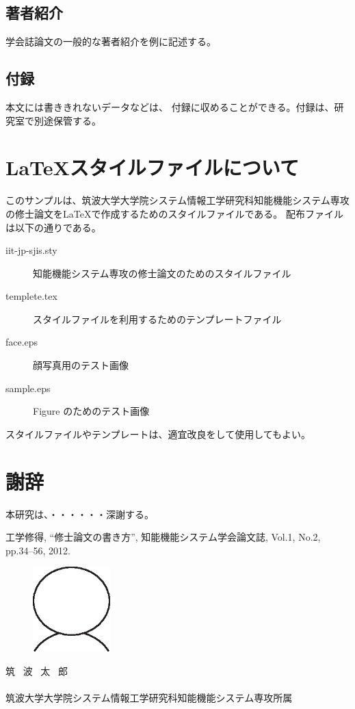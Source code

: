 ﻿\documentclass[11pt,twocolumn]{jarticle} %
\begin{document}
\subsection{著者紹介}
学会誌論文の一般的な著者紹介を例に記述する。

\subsection{付録}
本文には書ききれないデータなどは、
付録に収めることができる。付録は、研究室で別途保管する。



\section{\LaTeX スタイルファイルについて}
このサンプルは、筑波大学大学院システム情報工学研究科知能機能システム専攻の修士論文を\LaTeX で作成するためのスタイルファイルである。
配布ファイルは以下の通りである。
\begin{description}
 \item[iit-jp-sjis.sty]  知能機能システム専攻の修士論文のためのスタイルファイル
 \item[templete.tex] スタイルファイルを利用するためのテンプレートファイル
 \item[face.eps] 顔写真用のテスト画像
 \item[sample.eps] Figure のためのテスト画像
\end{description}

スタイルファイルやテンプレートは、適宜改良をして使用してもよい。

\section*{謝辞}
本研究は、・・・・・・深謝する。



\begin{thebibliography}{9}
  工学修得, ``修士論文の書き方'', 知能機能システム学会論文誌, Vol.1, No.2, pp.34--56, 2012.
\end{thebibliography}


\vspace{2zh}
\begin{minipage}{73mm}
 \begin{figure} 
 \begin{center}
  \includegraphics[width=30mm]{face.eps}
 \end{center}
 \end{figure}
 \noindent 筑 \ 波 \ 太 \  郎\\\\
 筑波大学大学院システム情報工学研究科知能機能システム専攻所属
\end{minipage}
\end{document}
